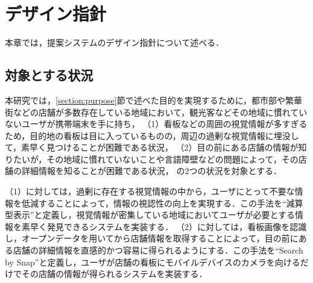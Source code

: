 \chapter{デザイン指針}
\label{chapter:design_guidline}
本章では，提案システムのデザイン指針について述べる．

\section{対象とする状況}
\label{section:target_situation}
  本研究では，\ref{section:purpose}節で述べた目的を実現するために，都市部や繁華街などの店舗が多数存在している地域において，観光客などその地域に慣れていないユーザが携帯端末を手に持ち，
  （1）看板などの周囲の視覚情報が多すぎるため，目的地の看板は目に入っているものの，周辺の過剰な視覚情報に埋没して，素早く見つけることが困難である状況，
  （2）目の前にある店舗の情報が知りたいが，その地域に慣れていないことや言語障壁などの問題によって，その店舗の詳細情報を知ることが困難である状況，
  の2つの状況を対象とする．

  （1）に対しては，過剰に存在する視覚情報の中から，ユーザにとって不要な情報を低減することによって，情報の視認性の向上を実現する．この手法を``減算型表示''と定義し，視覚情報が密集している地域においてユーザが必要とする情報を素早く発見できるシステムを実装する．
  （2）に対しては，看板画像を認識し，オープンデータを用いてから店舗情報を取得することによって，目の前にある店舗の詳細情報を直感的かつ容易に得られるようにする．この手法を``Search by Snap''と定義し，ユーザが店舗の看板にモバイルデバイスのカメラを向けるだけでその店舗の情報が得られるシステムを実装する．
  

